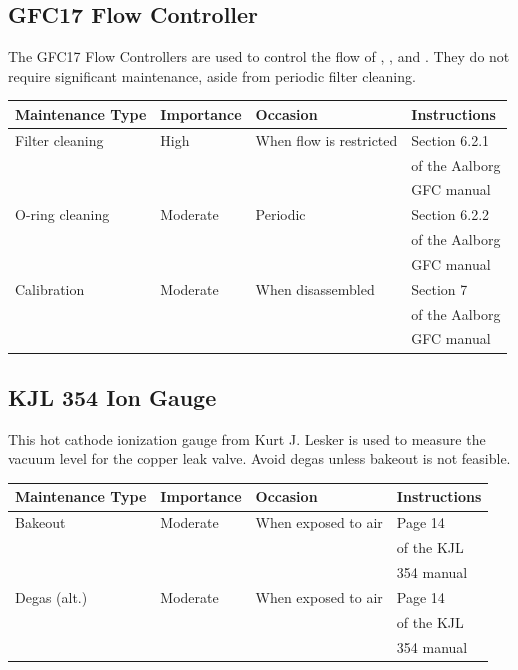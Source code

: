 \subsection{GFC17 Flow Controller}

The GFC17 Flow Controllers are used to control the flow of
, , and . They do not require significant maintenance,
aside from periodic filter cleaning.

\begin{table}[H]
  \centering
  \begin{tabular}{llll}
    \hline
    Maintenance Type & Importance & Occasion & Instructions \\
    \hline
    Filter cleaning & High & When flow is restricted & Section 6.2.1  \\
    &&& of the Aalborg \\
    &&& GFC manual \\
    O-ring cleaning & Moderate & Periodic & Section 6.2.2  \\
    &&& of the Aalborg \\
    &&& GFC manual \\
    Calibration & Moderate & When disassembled & Section 7  \\
    &&& of the Aalborg \\
    &&& GFC manual \\
    \hline
  \end{tabular}
\end{table}

\pagebreak

\subsection{KJL 354 Ion Gauge}

This hot cathode ionization gauge from Kurt J. Lesker is used to
measure the vacuum level for the copper leak valve. Avoid degas
unless bakeout is not feasible.

\begin{table}[H]
  \centering
  \begin{tabular}{llll}
    \hline
    Maintenance Type & Importance & Occasion & Instructions \\
    \hline
    Bakeout & Moderate & When exposed to air & Page 14  \\
    &&& of the KJL \\
    &&& 354 manual \\
    Degas (alt.) & Moderate & When exposed to air & Page 14  \\
    &&& of the KJL \\
    &&& 354 manual \\
    \hline
  \end{tabular}
\end{table}

